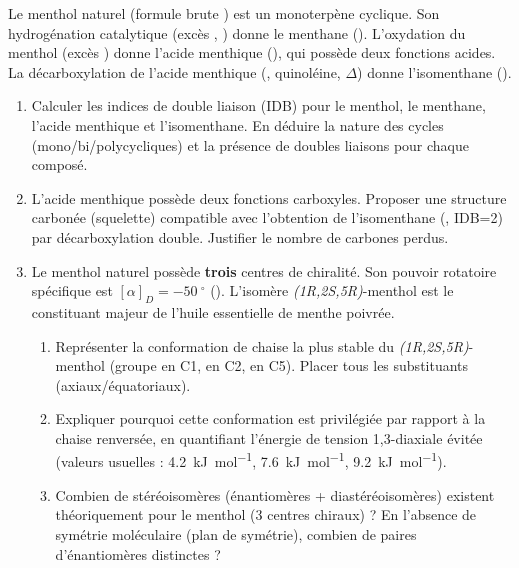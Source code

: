 \documentclass[11pt]{article}
\providecommand{\degree}{^{\circ}}
\begin{document}
\begin{exercice}
Le menthol naturel (formule brute ) est un monoterpène cyclique. Son hydrogénation catalytique (excès , ) donne le menthane (). L'oxydation du menthol (excès \ce{[O]}) donne l'acide menthique (), qui possède deux fonctions acides. La décarboxylation de l'acide menthique (, quinoléine, $\Delta$) donne l'isomenthane ().
\begin{enumerate}
    \item Calculer les indices de double liaison (IDB) pour le menthol, le menthane, l'acide menthique et l'isomenthane. En déduire la nature des cycles (mono/bi/polycycliques) et la présence de doubles liaisons pour chaque composé.
    \item L'acide menthique possède deux fonctions carboxyles. Proposer une structure carbonée (squelette) compatible avec l'obtention de l'isomenthane (, IDB=2) par décarboxylation double. Justifier le nombre de carbones perdus.
    \item Le menthol naturel possède \textbf{trois} centres de chiralité. Son pouvoir rotatoire spécifique est $[\alpha]_D = \SI{-50}{\degree}$ (). L'isomère \textit{(1R,2S,5R)}-menthol est le constituant majeur de l'huile essentielle de menthe poivrée.
    \begin{enumerate}
        \item Représenter la conformation de chaise la plus stable du \textit{(1R,2S,5R)}-menthol (groupe  en C1,  en C2,  en C5). Placer tous les substituants (axiaux/équatoriaux).
        \item Expliquer pourquoi cette conformation est privilégiée par rapport à la chaise renversée, en quantifiant l'énergie de tension 1,3-diaxiale évitée (valeurs usuelles :  \approx \SI{4,2}{\kilo\joule\per\mole},  \approx \SI{7,6}{\kilo\joule\per\mole},  \approx \SI{9,2}{\kilo\joule\per\mole}).
        \item Combien de stéréoisomères (énantiomères + diastéréoisomères) existent théoriquement pour le menthol (3 centres chiraux) ? En l'absence de symétrie moléculaire (plan de symétrie), combien de paires d'énantiomères distinctes ?
    \end{enumerate}
\end{enumerate}
\end{exercice}
\end{document}

